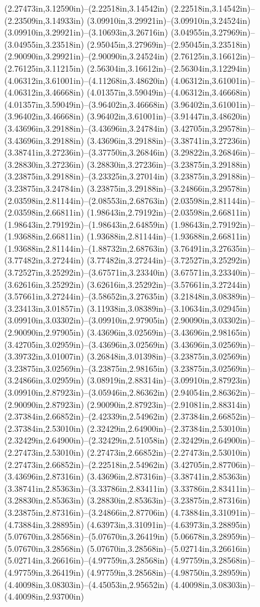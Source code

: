 (2.27473in,3.12590in)--(2.22518in,3.14542in) (2.22518in,3.14542in)--(2.23509in,3.14933in) (3.09910in,3.29921in)--(3.09910in,3.24524in) (3.09910in,3.29921in)--(3.10693in,3.26716in) (3.04955in,3.27969in)--(3.04955in,3.23518in) (2.95045in,3.27969in)--(2.95045in,3.23518in) (2.90090in,3.29921in)--(2.90090in,3.24524in) (2.76125in,3.16612in)--(2.76125in,3.11215in) (2.56304in,3.16612in)--(2.56304in,3.12294in) (4.06312in,3.61001in)--(4.11268in,3.48620in) (4.06312in,3.61001in)--(4.06312in,3.46668in) (4.01357in,3.59049in)--(4.06312in,3.46668in) (4.01357in,3.59049in)--(3.96402in,3.46668in) (3.96402in,3.61001in)--(3.96402in,3.46668in) (3.96402in,3.61001in)--(3.91447in,3.48620in) (3.43696in,3.29188in)--(3.43696in,3.24784in) (3.42705in,3.29578in)--(3.43696in,3.29188in) (3.43696in,3.29188in)--(3.38741in,3.27236in) (3.38741in,3.27236in)--(3.37750in,3.26846in) (3.29822in,3.26846in)--(3.28830in,3.27236in) (3.28830in,3.27236in)--(3.23875in,3.29188in) (3.23875in,3.29188in)--(3.23325in,3.27014in) (3.23875in,3.29188in)--(3.23875in,3.24784in) (3.23875in,3.29188in)--(3.24866in,3.29578in) (2.03598in,2.81144in)--(2.08553in,2.68763in) (2.03598in,2.81144in)--(2.03598in,2.66811in) (1.98643in,2.79192in)--(2.03598in,2.66811in) (1.98643in,2.79192in)--(1.98643in,2.64859in) (1.98643in,2.79192in)--(1.93688in,2.66811in) (1.93688in,2.81144in)--(1.93688in,2.66811in) (1.93688in,2.81144in)--(1.88732in,2.68763in) (3.76491in,3.27635in)--(3.77482in,3.27244in) (3.77482in,3.27244in)--(3.72527in,3.25292in) (3.72527in,3.25292in)--(3.67571in,3.23340in) (3.67571in,3.23340in)--(3.62616in,3.25292in) (3.62616in,3.25292in)--(3.57661in,3.27244in) (3.57661in,3.27244in)--(3.58652in,3.27635in) (3.21848in,3.08389in)--(3.23413in,3.01857in) (3.11938in,3.08389in)--(3.10634in,3.02945in) (3.09910in,3.03302in)--(3.09910in,2.97905in) (2.90090in,3.03302in)--(2.90090in,2.97905in) (3.43696in,3.02569in)--(3.43696in,2.98165in) (3.42705in,3.02959in)--(3.43696in,3.02569in) (3.43696in,3.02569in)--(3.39732in,3.01007in) (3.26848in,3.01398in)--(3.23875in,3.02569in) (3.23875in,3.02569in)--(3.23875in,2.98165in) (3.23875in,3.02569in)--(3.24866in,3.02959in) (3.08919in,2.88314in)--(3.09910in,2.87923in) (3.09910in,2.87923in)--(3.05946in,2.86362in) (2.94054in,2.86362in)--(2.90090in,2.87923in) (2.90090in,2.87923in)--(2.91081in,2.88314in) (2.37384in,2.66852in)--(2.42339in,2.54962in) (2.37384in,2.66852in)--(2.37384in,2.53010in) (2.32429in,2.64900in)--(2.37384in,2.53010in) (2.32429in,2.64900in)--(2.32429in,2.51058in) (2.32429in,2.64900in)--(2.27473in,2.53010in) (2.27473in,2.66852in)--(2.27473in,2.53010in) (2.27473in,2.66852in)--(2.22518in,2.54962in) (3.42705in,2.87706in)--(3.43696in,2.87316in) (3.43696in,2.87316in)--(3.38741in,2.85363in) (3.38741in,2.85363in)--(3.33786in,2.83411in) (3.33786in,2.83411in)--(3.28830in,2.85363in) (3.28830in,2.85363in)--(3.23875in,2.87316in) (3.23875in,2.87316in)--(3.24866in,2.87706in) (4.73884in,3.31091in)--(4.73884in,3.28895in) (4.63973in,3.31091in)--(4.63973in,3.28895in) (5.07670in,3.28568in)--(5.07670in,3.26419in) (5.06678in,3.28959in)--(5.07670in,3.28568in) (5.07670in,3.28568in)--(5.02714in,3.26616in) (5.02714in,3.26616in)--(4.97759in,3.28568in) (4.97759in,3.28568in)--(4.97759in,3.26419in) (4.97759in,3.28568in)--(4.98750in,3.28959in) (4.40098in,3.08303in)--(4.45053in,2.95652in) (4.40098in,3.08303in)--(4.40098in,2.93700in) 